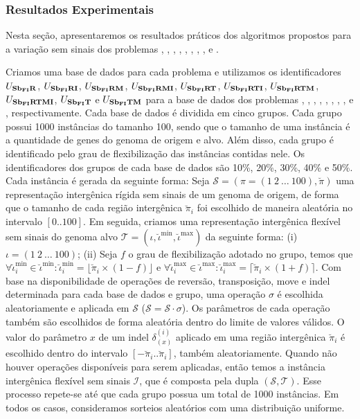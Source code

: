 \subsubsection{Resultados Experimentais}\label{subsubsection:PWLZZAVH}

Nesta seção, apresentaremos os resultados práticos dos algoritmos propostos para a variação sem sinais dos problemas \SbFIR{}, \SbFIRI{}, \SbFIRM{}, \SbFIRMI{}, \SbFIRT{}, \SbFIRTI{}, \SbFIRTM{}, \SbFIRTMI{}, \SbFIT{} e \SbFITM{}.

Criamos uma base de dados para cada problema e utilizamos os identificadores $U_{\textbf{Sb\textsubscript{FI}R}}{}$, $U_{\textbf{Sb\textsubscript{FI}RI}}{}$, $U_{\textbf{Sb\textsubscript{FI}RM}}{}$, $U_{\textbf{Sb\textsubscript{FI}RMI}}{}$, $U_{\textbf{Sb\textsubscript{FI}RT}}{}$, $U_{\textbf{Sb\textsubscript{FI}RTI}}{}$, $U_{\textbf{Sb\textsubscript{FI}RTM}}{}$, $U_{\textbf{Sb\textsubscript{FI}RTMI}}{}$, $U_{\textbf{Sb\textsubscript{FI}T}}{}$ e \break$U_{\textbf{Sb\textsubscript{FI}TM}}{}$ para a base de dados dos problemas \SbFIR{}, \SbFIRI{}, \SbFIRM{}, \SbFIRMI{}, \SbFIRT{}, \SbFIRTI{}, \SbFIRTM{}, \SbFIRTMI{}, \SbFIT{} e \SbFITM{}, respectivamente. Cada base de dados é dividida em cinco grupos. Cada grupo possui 1000 instâncias do tamanho 100, sendo que o tamanho de uma instância é a quantidade de genes do genoma de origem e alvo. Além disso, cada grupo é identificado pelo grau de flexibilização das instâncias contidas nele. Os identificadores dos grupos de cada base de dados são 10\%, 20\%, 30\%, 40\% e 50\%. Cada instância é gerada da seguinte forma: Seja $\mathcal{S} = (\pi =(1~2~\dots~100),\breve\pi)$ uma representação intergênica rígida sem sinais de um genoma de origem, de forma que o tamanho de cada região intergênica $\breve\pi_i$ foi escolhido de maneira aleatória no intervalo $[0..100]$. Em seguida, criamos uma representação intergênica flexível sem sinais do genoma alvo $\mathcal{T} = (\iota, \breve\iota^{\min},\breve\iota^{\max})$ da seguinte forma: (i) $\iota =(1~2~\dots~100)$; (ii) Seja $f$ o grau de flexibilização adotado no grupo, temos que $\forall \breve\iota^{\min}_i \in \breve\iota^{\min}: \breve\iota^{\min}_i = \lfloor\breve\pi_i \times (1 - f)\rfloor$ e $\forall \breve\iota^{\max}_i \in \breve\iota^{\max} : \breve\iota^{\max}_i = \lceil\breve\pi_i \times (1 + f)\rceil$. Com base na disponibilidade de operações de reversão, transposição, move e indel determinada para cada base de dados e grupo, uma operação $\sigma$ é escolhida aleatoriamente e aplicada em $\mathcal{S}$ ($\mathcal{S} = \mathcal{S} \cdot \sigma$). Os parâmetros de cada operação também são escolhidos de forma aleatória dentro do limite de valores válidos. O valor do parâmetro $x$ de um indel $\delta^{(i)}_{(x)}$ aplicado em uma região intergênica $\breve\pi_{i}$ é escolhido dentro do intervalo $[-\breve\pi_{i}..\breve\pi_{i}]$, também aleatoriamente. Quando não houver operações disponíveis para serem aplicadas, então temos a instância intergênica flexível sem sinais $\mathcal{I}$, que é composta pela dupla $(\mathcal{S},\mathcal{T})$. Esse processo repete-se até que cada grupo possua um total de 1000 instâncias. Em todos os casos, consideramos sorteios aleatórios com uma distribuição uniforme.

